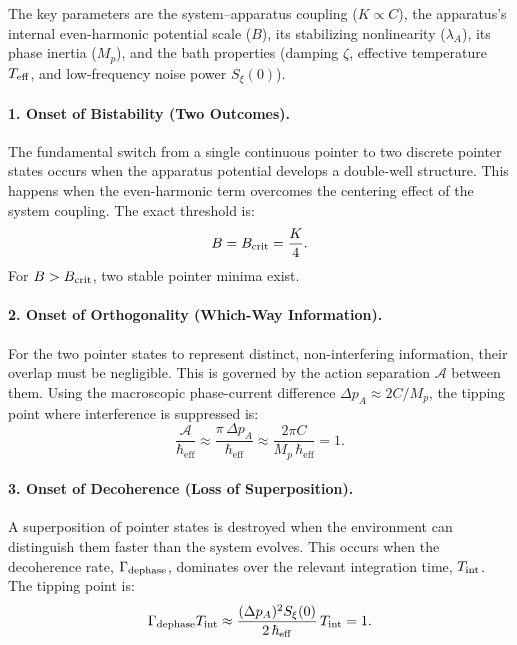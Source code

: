 \documentclass[11pt]{article}
\begin{document}
The key parameters are the system–apparatus coupling ($K \propto C$), the apparatus's internal even-harmonic potential scale ($B$), its stabilizing nonlinearity ($\lambda_A$), its phase inertia ($M_p$), and the bath properties (damping $\zeta$, effective temperature $T_{\rm eff}$, and low-frequency noise power $S_\xi(0)$).

\paragraph{1. Onset of Bistability (Two Outcomes).} The fundamental switch from a single continuous pointer to two discrete pointer states occurs when the apparatus potential develops a double-well structure. This happens when the even-harmonic term overcomes the centering effect of the system coupling. The exact threshold is:
\begin{equation}
  B = B_{\rm crit} = \frac{K}{4}.
\end{equation}
For $B > B_{\rm crit}$, two stable pointer minima exist.

\paragraph{2. Onset of Orthogonality (Which-Way Information).} For the two pointer states to represent distinct, non-interfering information, their overlap must be negligible. This is governed by the action separation $\mathcal{A}$ between them. Using the macroscopic phase-current difference $\Delta p_A \approx 2C/M_p$, the tipping point where interference is suppressed is:
\begin{equation}
  \frac{\mathcal{A}}{\hbar_{\mathrm{eff}}} \approx \frac{\pi \, \Delta p_A}{\hbar_{\mathrm{eff}}} \approx \frac{2\pi C}{M_p \, \hbar_{\mathrm{eff}}} = 1.
\end{equation}

\paragraph{3. Onset of Decoherence (Loss of Superposition).} A superposition of pointer states is destroyed when the environment can distinguish them faster than the system evolves. This occurs when the decoherence rate, $\Gamma_{\rm dephase}$, dominates over the relevant integration time, $T_{\rm int}$. The tipping point is:
\begin{equation}
  \Gamma_{\rm dephase} T_{\rm int} \approx \frac{(\Delta p_A)^2 S_\xi(0)}{2\,\hbar_{\mathrm{eff}}} \, T_{\rm int} = 1.
\end{equation}
\end{document}
